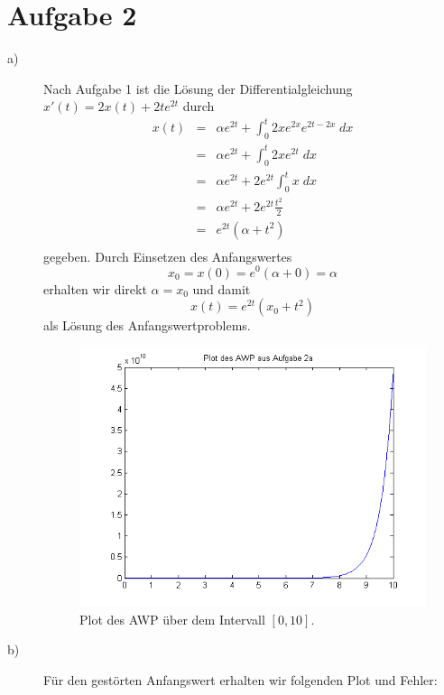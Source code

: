 \documentclass[11pt,a4paper,ngerman]{article}
\begin{document}
\section*{Aufgabe 2}
\begin{description}
\item[a)] Nach Aufgabe 1 ist die Lösung der Differentialgleichung $x'(t)  = 2x(t) + 2te^{2t}$ durch
\begin{eqnarray*}
x(t) &=& \alpha e^{2t} + \int_0^t 2xe^{2x}e^{2t-2x} \; dx\\
&=& \alpha e^{2t} + \int_0^t 2xe^{2t} \; dx\\
&=& \alpha e^{2t} + 2e^{2t} \int_0^t x \; dx\\
&=& \alpha e^{2t} + 2e^{2t} \frac{t^2}{2} \\
&=& e^{2t} (\alpha  +  t^2) \\
\end{eqnarray*}
gegeben.
Durch Einsetzen des Anfangswertes
$$
x_0 = x(0) = e^0 (\alpha + 0) = \alpha
$$
erhalten wir direkt $\alpha = x_0$ und damit
$$x(t) = e^{2t} (x_0  +  t^2)$$
als Lösung des Anfangswertproblems.

\begin{figure}[ht!]
\center
\includegraphics[scale=0.6]{ueb6auf2a.png}
\caption{Plot des AWP über dem Intervall $[0, 10]$.}
\end{figure}
\newpage
\item[b)] Für den gestörten Anfangswert erhalten wir folgenden Plot und Fehler:


\end{description}
\end{document}
